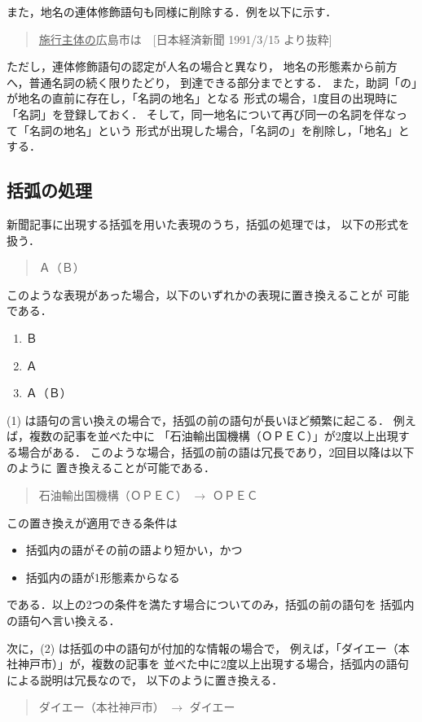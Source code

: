 また，地名の連体修飾語句も同様に削除する．例を以下に示す．

\begin{quote}
\underline{施行主体の}広島市は　[日本経済新聞 1991/3/15 より抜粋]
\end{quote}

ただし，連体修飾語句の認定が人名の場合と異なり，
地名の形態素から前方へ，普通名詞の続く限りたどり，
到達できる部分までとする．
また，助詞「の」が地名の直前に存在し，「名詞の地名」となる
形式の場合，1度目の出現時に「名詞」を登録しておく．
そして，同一地名について再び同一の名詞を伴なって「名詞の地名」という
形式が出現した場合，「名詞の」を削除し，「地名」とする．

\subsection{括弧の処理}
新聞記事に出現する括弧を用いた表現のうち，括弧の処理では，
以下の形式を扱う．
\begin{quote}
Ａ（Ｂ）
\end{quote}
このような表現があった場合，以下のいずれかの表現に置き換えることが
可能である．
\begin{enumerate}
 \item Ｂ
 \item Ａ
 \item Ａ（Ｂ）
\end{enumerate}

(1) は語句の言い換えの場合で，括弧の前の語句が長いほど頻繁に起こる．
例えば，複数の記事を並べた中に
「石油輸出国機構（ＯＰＥＣ）」が2度以上出現する場合がある．
このような場合，括弧の前の語は冗長であり，2回目以降は以下のように
置き換えることが可能である．
\begin{quote}
石油輸出国機構（ＯＰＥＣ） $\rightarrow$ ＯＰＥＣ
\end{quote}

この置き換えが適用できる条件は
\begin{itemize}
 \item 括弧内の語がその前の語より短かい，かつ
 \item 括弧内の語が1形態素からなる
\end{itemize}
である．以上の2つの条件を満たす場合についてのみ，括弧の前の語句を
括弧内の語句へ言い換える．

次に，(2) は括弧の中の語句が付加的な情報の場合で，
例えば，「ダイエー（本社神戸市）」が，複数の記事を
並べた中に2度以上出現する場合，括弧内の語句による説明は冗長なので，
以下のように置き換える．
\begin{quote}
ダイエー（本社神戸市） $\rightarrow$ ダイエー
\end{quote}


